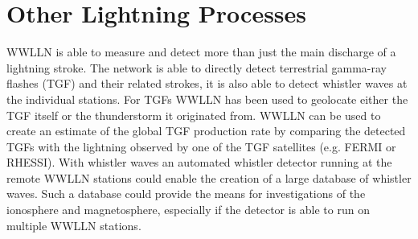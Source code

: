 \section{Other Lightning Processes}

WWLLN is able to measure and detect more than just the main discharge of a lightning stroke.
The network is able to directly detect terrestrial gamma-ray flashes (TGF) and their related strokes, it is also able to detect whistler waves at the individual stations.
For TGFs WWLLN has been used to geolocate either the TGF itself or the thunderstorm it originated from.
WWLLN can be used to create an estimate of the global TGF production rate by comparing the detected TGFs with the lightning observed by one of the TGF satellites (e.g. FERMI or RHESSI).
With whistler waves an automated whistler detector running at the remote WWLLN stations could enable the creation of a large database of whistler waves.
Such a database could provide the means for investigations of the ionosphere and magnetosphere, especially if the detector is able to run on multiple WWLLN stations.







